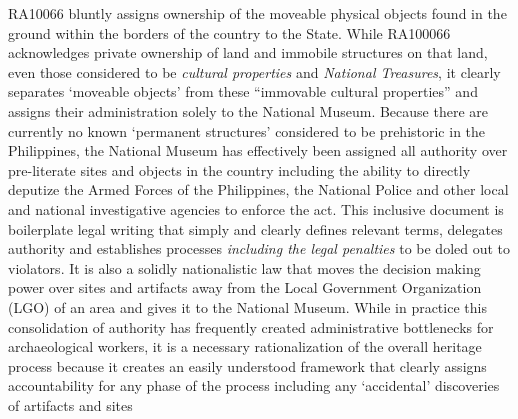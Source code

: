 \documentclass[spanish]{ijsra}
\begin{document}
RA10066 bluntly assigns ownership of the moveable physical objects found in the ground within the borders of the country to the State. While RA100066 acknowledges private ownership of land and immobile structures on that land, even those considered to be \textit{cultural properties} and \textit{National Treasures}, it clearly separates ‘moveable objects’ from these “immovable cultural properties” %
 and assigns their administration solely to the National Museum. Because there are currently no known ‘permanent structures’ considered to be prehistoric in the Philippines, the National Museum has effectively been assigned all authority over pre-literate sites and objects in the country including the ability to directly deputize the Armed Forces of the Philippines, the National Police and other local and national investigative agencies to enforce the act. 
This inclusive document is boilerplate legal writing that simply and clearly defines relevant terms, delegates authority and establishes processes \textit{including the legal penalties} to be doled out to violators. It is also a solidly nationalistic law that moves the decision making power over sites and artifacts away from the Local Government Organization (LGO) of an area and gives it to the National Museum. While in practice this consolidation of authority has frequently created administrative bottlenecks for archaeological workers, it is a necessary rationalization of the overall heritage process because it creates an easily understood framework that clearly assigns accountability for any phase of the process including any ‘accidental’ discoveries of artifacts and sites %
\end{document}
